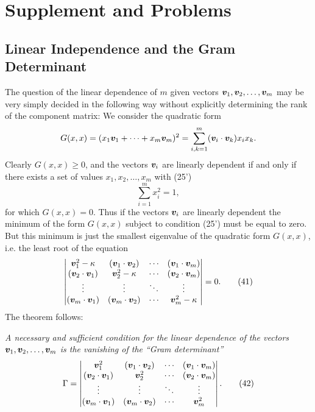 \section{Supplement and Problems}
\subsection{Linear Independence and the Gram Determinant}
The question of the linear dependence of $m$ given vectors $\bm{v}_1,\bm{v}_2,\ldots,\bm{v}_m$ may be very simply decided in the following way without explicitly determining the rank of the component matrix: We consider the quadratic form
\[
G(x,x)=(x_1\bm{v}_1+\cdots+x_m\bm{v}_m)^2
=\sum_{i,k=1}^{m}(\bm{v}_i\cdot\bm{v}_k)x_ix_k.
\]
Clearly $G(x,x)\ge0$, and the vectors $\bm{v}_i$ are linearly dependent if and only if there exists a set of values $x_1,x_2,\ldots,x_m$ with (25')
\[
\sum_{i=1}^{m}x_i^2=1,
\]
for which $G(x,x)=0$. Thus if the vectors $\bm{v}_i$ are linearly dependent the minimum of the form $G(x,x)$ subject to condition (25') must be equal to zero. But this minimum is just the smallest eigenvalue of the quadratic form $G(x,x)$, i.e. the least root of the equation
\begin{equation*}
\begin{vmatrix}
\bm{v}_1^2-\kappa&(\bm{v}_1\cdot\bm{v}_2)&\cdots&(\bm{v}_1\cdot\bm{v}_m)\\
(\bm{v}_2\cdot\bm{v}_1)&\bm{v}_2^2-\kappa&\cdots&(\bm{v}_2\cdot\bm{v}_m)\\
\vdots&\vdots&\ddots&\vdots\\
(\bm{v}_m\cdot\bm{v}_1)&(\bm{v}_m\cdot\bm{v}_2)&\cdots&\bm{v}_m^2-\kappa
\end{vmatrix}=0.
\tag{41}
\end{equation*}
The theorem follows:

\emph{A necessary and sufficient condition for the linear dependence of the vectors $\bm{v}_1,\bm{v}_2,\ldots,\bm{v}_m$ is the vanishing of the ``Gram determinant''}
\begin{equation*}
\Gamma=
\begin{vmatrix}
\bm{v}_1^2&(\bm{v}_1\cdot\bm{v}_2)&\cdots&(\bm{v}_1\cdot\bm{v}_m)\\
(\bm{v}_2\cdot\bm{v}_1)&\bm{v}_2^2&\cdots&(\bm{v}_2\cdot\bm{v}_m)\\
\vdots&\vdots&\ddots&\vdots\\
(\bm{v}_m\cdot\bm{v}_1)&(\bm{v}_m\cdot\bm{v}_2)&\cdots&\bm{v}_m^2
\end{vmatrix}.
\tag{42}
\end{equation*}


